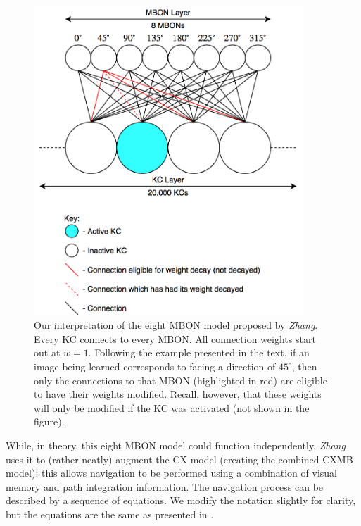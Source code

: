 \documentclass[a4paper,11pt,twoside,openright]{article}
\begin{document}
\begin{figure}[h!]
  \centering
  \includegraphics[width=0.9\textwidth]{EightENModel}
  \caption{\label{fig:eightmbon} Our interpretation of the eight MBON model
    proposed by \textit{Zhang}. Every KC connects to every MBON. All connection
    weights start out at $w=1$. Following the example presented in the text,
    if an image being learned corresponds to facing a direction of $45^{\circ}$,
    then only the conncetions to that MBON (highlighted in red) are eligible to
    have their weights modified. Recall, however, that these weights will only
    be modified if the KC was activated (not shown in the figure).
    }
\end{figure}

While, in theory, this eight MBON model could function independently,
\textit{Zhang} uses it to (rather neatly) augment the CX model
(creating the combined CXMB model); this allows navigation to be
performed using a combination of visual memory and path integration
information. The navigation process can be described by a sequence of
equations. We modify the notation slightly for clarity, but the
equations are the same as presented in \cite{Zhang2017}.
\newline
\par
\end{document}
